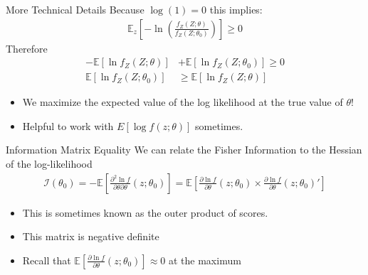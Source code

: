 \documentclass[aspectratio=169]{beamer}
\begin{document}
\begin{frame}{More Technical Details}
Because $\log(1)=0$ this implies:
\begin{align*}
\mathbb { E }_z \left[ - \ln \left( \frac { f _ { Z } ( Z ; \theta ) } { f _ { Z } \left( Z ; \theta _ { 0 } \right) } \right) \right] \geq 0
\end{align*}
Therefore 
\begin{align*}
- \mathbb { E } \left[ \ln f _ { Z } ( Z ; \theta ) \right] &+ \mathbb { E } \left[ \ln f _ { Z } \left( Z ; \theta _ { 0 } \right) \right] \geq 0\\
\mathbb { E } \left[ \ln f _ { Z } \left( Z ; \theta _ { 0 } \right) \right] &\geq \mathbb { E } \left[ \ln f _ { Z } ( Z ; \theta ) \right]
\end{align*}
\begin{itemize}
\item We maximize the expected value of the log likelihood at the true value of $\theta$!
\item Helpful to work with $E[\log f(z; \theta)]$ sometimes.
\end{itemize}
\end{frame}


\begin{frame}{Information Matrix Equality}
We can relate the \alert{Fisher Information} to the Hessian of the log-likelihood
\begin{align*}
\mathcal { I } \left( \theta _ { 0 } \right) = - \mathbb { E } \left[ \frac { \partial ^ { 2 } \ln f } { \partial \theta \partial \theta } \left( z ; \theta _ { 0 } \right) \right] 
= \mathbb { E } \left[ \frac { \partial \ln f } { \partial \theta } \left( z ; \theta _ { 0 } \right) \times \frac { \partial \ln f } { \partial \theta  } \left( z ; \theta _ { 0 } \right)' \right]
\end{align*}
\begin{itemize}
    \item This is sometimes known as the \alert{outer product of scores}.
    \item This matrix is \alert{negative definite}
    \item Recall that $ \mathbb { E } \left[ \frac { \partial \ln f } { \partial \theta } \left( z ; \theta _ { 0 } \right) \right]\approx 0$ at the maximum
\end{itemize}
\end{frame}
\end{document}
